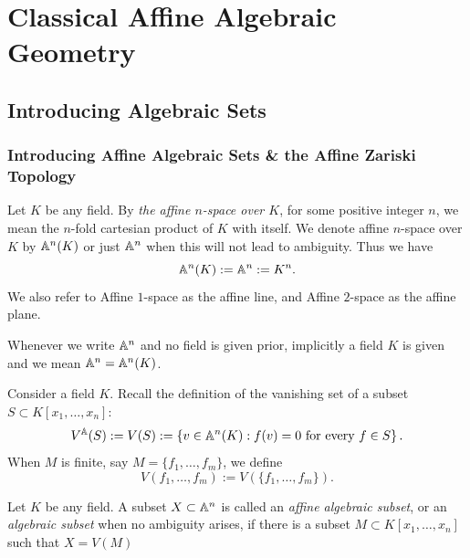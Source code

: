\section{Classical Affine Algebraic Geometry}
\subsection{Introducing Algebraic Sets}
\subsubsection{Introducing Affine Algebraic Sets \& the Affine Zariski Topology}
\begin{definition}\label{AffineSpaceDefinition}
    Let $K$ be any field. By \textit{the affine $n$-space over $K$}, for some positive integer $n$, we mean the $n$-fold cartesian product of $K$ with itself. We denote affine $n$-space over $K$ by $\mathbb{A}^n(K)$ or just $\mathbb{A}^n$ when this will not lead to ambiguity. Thus we have 
    $$\mathbb{A}^n(K) := \mathbb{A}^n := K^n.$$
    We also refer to Affine $1$-space as the affine line, and Affine $2$-space as the affine plane. 
\end{definition}
\begin{remark}
    Whenever we write $\mathbb{A}^n$ and no field is given prior, implicitly a field $K$ is given and we mean $\mathbb{A}^n = \mathbb{A}^n(K)$.
\end{remark}
\begin{definition}\label{VanishingSetDefinition}
    Consider a field $K$. Recall the definition of the vanishing set of a subset $S\subset K[x_1,\dots,x_n]$:
    $$V^{\mathbb{A}}(S) := V(S):=\left\{ v\in \mathbb{A}^n(K) : f(v)=0 \text{ for every } f\in S  \right\}.$$
    When $M$ is finite, say $M= \{f_1,\dots,f_m\}$, we define 
    $$V(f_1,\dots,f_m) := V(\{f_1,\dots,f_m\}).$$
\end{definition}

\begin{definition}\label{AlgebraicSubsetDefinition}
    Let $K$ be any field. A subset $X \subset \mathbb{A}^n$ is called an \textit{affine algebraic subset}, or an \textit{algebraic subset} when no ambiguity arises, if there is a subset $M\subset K[x_1,\dots,x_n]$ such that $X = V(M)$ 
\end{definition}

